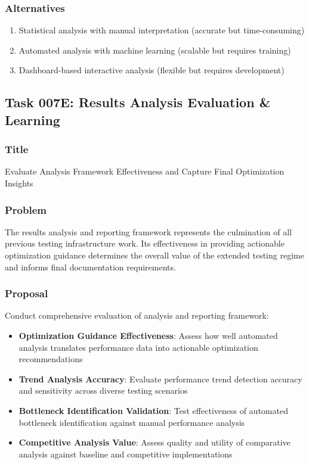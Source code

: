 \documentclass[11pt,a4paper]{article}
\begin{document}
\subsubsection{Alternatives}
\begin{enumerate}
    \item Statistical analysis with manual interpretation (accurate but time-consuming)
    \item Automated analysis with machine learning (scalable but requires training)
    \item Dashboard-based interactive analysis (flexible but requires development)
\end{enumerate}

\subsection{Task 007E: Results Analysis Evaluation \& Learning}

\subsubsection{Title}
Evaluate Analysis Framework Effectiveness and Capture Final Optimization Insights

\subsubsection{Problem}
The results analysis and reporting framework represents the culmination of all previous testing infrastructure work. Its effectiveness in providing actionable optimization guidance determines the overall value of the extended testing regime and informs final documentation requirements.

\subsubsection{Proposal}
Conduct comprehensive evaluation of analysis and reporting framework:
\begin{itemize}
    \item \textbf{Optimization Guidance Effectiveness}: Assess how well automated analysis translates performance data into actionable optimization recommendations
    \item \textbf{Trend Analysis Accuracy}: Evaluate performance trend detection accuracy and sensitivity across diverse testing scenarios
    \item \textbf{Bottleneck Identification Validation}: Test effectiveness of automated bottleneck identification against manual performance analysis
    \item \textbf{Competitive Analysis Value}: Assess quality and utility of comparative analysis against baseline and competitive implementations
\end{itemize}
\end{document}
